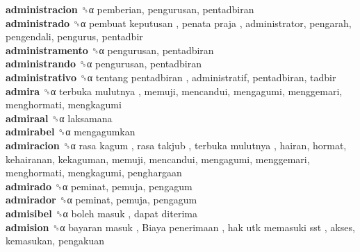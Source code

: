 \textbf{administracion} ␝α  pemberian, pengurusan, pentadbiran  \\
\textbf{administrado} ␝α   pembuat keputusan ,  penata praja , administrator, pengarah, pengendali, pengurus, pentadbir  \\
\textbf{administramento} ␝α  pengurusan, pentadbiran  \\
\textbf{administrando} ␝α  pengurusan, pentadbiran  \\
\textbf{administrativo} ␝α   tentang pentadbiran , administratif, pentadbiran, tadbir  \\
\textbf{admira} ␝α   terbuka mulutnya , memuji, mencandui, mengagumi, menggemari, menghormati, mengkagumi  \\
\textbf{admiraal} ␝α  laksamana  \\
\textbf{admirabel} ␝α  mengagumkan  \\
\textbf{admiracion} ␝α   rasa kagum ,  rasa takjub ,  terbuka mulutnya , hairan, hormat, kehairanan, kekaguman, memuji, mencandui, mengagumi, menggemari, menghormati, mengkagumi, penghargaan  \\
\textbf{admirado} ␝α  peminat, pemuja, pengagum  \\
\textbf{admirador} ␝α  peminat, pemuja, pengagum  \\
\textbf{admisibel} ␝α   boleh masuk ,  dapat diterima   \\
\textbf{admision} ␝α   bayaran masuk ,  Biaya penerimaan ,  hak utk memasuki sst , akses, kemasukan, pengakuan  \\
